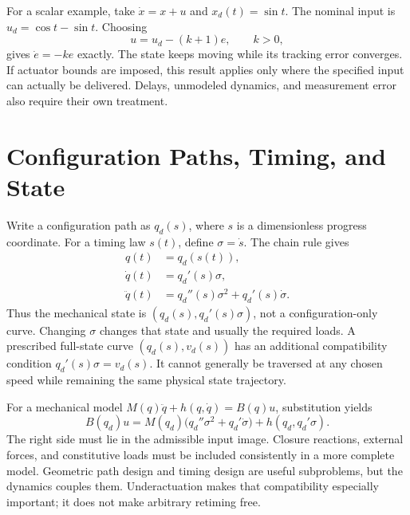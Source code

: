 \documentclass[12pt, openany]{book}
\theoremstyle{plain}
\begin{document}
For a scalar example, take $\dot x=x+u$ and $x_d(t)=\sin t$. The nominal input
is $u_d=\cos t-\sin t$. Choosing
\begin{equation}
 u=u_d-(k+1)e,\qquad k>0,
 \label{eq:motion_tracking_example}
\end{equation}
gives $\dot e=-ke$ exactly. The state keeps moving while its tracking error
converges. If actuator bounds are imposed, this result applies only where the
specified input can actually be delivered. Delays, unmodeled dynamics, and
measurement error also require their own treatment.

\section{Configuration Paths, Timing, and State}

Write a configuration path as $q_d(s)$, where $s$ is a dimensionless progress
coordinate. For a timing law $s(t)$, define $\sigma=\dot s$. The chain rule gives
\begin{equation}
 \begin{aligned}
 q(t)&=q_d(s(t)),\\
 \dot q(t)&=q_d'(s)\sigma,\\
 \ddot q(t)&=q_d''(s)\sigma^2+q_d'(s)\dot\sigma.
 \end{aligned}
 \label{eq:motion_path_timing}
\end{equation}
Thus the mechanical state is $(q_d(s),q_d'(s)\sigma)$, not a configuration-only
curve. Changing $\sigma$ changes that state and usually the required loads.
A prescribed full-state curve $(q_d(s),v_d(s))$ has an additional compatibility
condition $q_d'(s)\sigma=v_d(s)$. It cannot generally be traversed at any chosen
speed while remaining the same physical state trajectory.

For a mechanical model $M(q)\ddot q+h(q,\dot q)=B(q)u$, substitution yields
\begin{equation}
 B(q_d)u=M(q_d)\bigl(q_d''\sigma^2+q_d'\dot\sigma\bigr)
             +h(q_d,q_d'\sigma).
 \label{eq:motion_timing_feasibility}
\end{equation}
The right side must lie in the admissible input image. Closure reactions,
external forces, and constitutive loads must be included consistently in a
more complete model. Geometric path design and timing design are useful
subproblems, but the dynamics couples them. Underactuation makes that
compatibility especially important; it does not make arbitrary retiming free.
\end{document}
